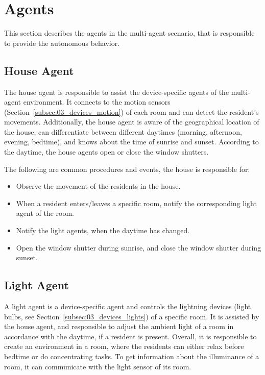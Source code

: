 \documentclass[letterpaper, 11pt]{Proposal}
\def\Sec#1{Section~\ref{#1}}
\begin{document}
\section{Agents}\label{sec:05_agents}
This section describes the agents in the multi-agent scenario, that is
responsible to provide the autonomous behavior.

\subsection{House Agent}
The house agent is responsible to assist the device-specific agents of
the multi-agent environment.
It connects to the motion sensors (\Sec{subsec:03_devices_motion}) of each room 
and can detect the resident's movements.
Additionally, the house agent is aware of the geographical location of
the house, can differentiate between different daytimes 
(morning, afternoon, evening, bedtime), and knows about the time of sunrise and sunset.
According to the daytime, the house agents open or close the window shutters.

The following are common procedures and events, the house is responsible for:
\begin{itemize}
\item Observe the movement of the residents in the house.
\item When a resident enters/leaves a specific room, notify the corresponding light agent of the room.
\item Notify the light agents, when the daytime has changed. 
\item Open the window shutter during sunrise, and close the window shutter during sunset.
\end{itemize}

\subsection{Light Agent}
A light agent is a device-specific agent and controls the lightning devices 
(light bulbs, see \Sec{subsec:03_devices_lights}) of a specific room. 
It is assisted by the house agent, and responsible to adjust the ambient light of a room
in accordance with the daytime, if a resident is present.
Overall, it is responsible to create an environment in a room, where the residents
can either relax before bedtime or do concentrating tasks.
To get information about the illuminance of a room, it can communicate with the
light sensor of its room.
\end{document}
